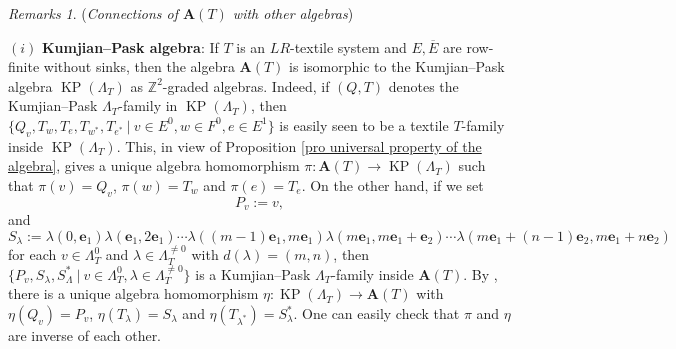 \documentclass[a4paper,reqno,12pt]{amsart}
\newcommand{\KP}{\operatorname{KP}}
\newcommand{\ea}{\mathbf{e}_1}
\newcommand{\eb}{\mathbf{e}_2}
\theoremstyle{definition}
\theoremstyle{remark}
\newtheorem{rmks}[thm]{Remarks}
\begin{document}
\begin{rmks}\label{rem connecting with other algebras}
(\emph{Connections of $\mathbf{A}(T)$ with other algebras})



$(i)$ \textbf{Kumjian--Pask algebra}: If $T$ is an $LR$-textile system and $E,\overline{E}$ are row-finite without sinks, then the algebra $\mathbf{A}(T)$ is isomorphic to the Kumjian--Pask algebra $\KP(\Lambda_T)$ as $\mathbb{Z}^2$-graded algebras. Indeed, if $(Q,T)$ denotes the Kumjian--Pask $\Lambda_T$-family in $\KP(\Lambda_T)$, then $\{Q_v,T_w,T_e,T_{w^*},T_{e^*}~|~v\in E^0,w\in F^0,e\in E^1\}$ is easily seen to be a textile $T$-family inside $\KP(\Lambda_T)$. This, in view of Proposition \ref{pro universal property of the algebra}, gives a unique algebra homomorphism $\pi:\mathbf{A}(T)\longrightarrow \KP(\Lambda_T)$ such that $\pi(v)=Q_v$, $\pi(w)=T_w$ and $\pi(e)=T_e$. On the other hand, if we set \[P_v:=v,\] and \[S_\lambda:=\lambda(0,\ea)\lambda(\ea,2\ea)\cdots \lambda((m-1)\ea,m\ea)\lambda(m\ea,m\ea+\eb)\cdots\lambda(m\ea+(n-1)\eb,m\ea+n\eb)\] for each $v\in \Lambda_T^0$ and $\lambda\in \Lambda_T^{\neq 0}$ with $d(\lambda)=(m,n)$, then $\{P_v,S_\lambda,S_{\Lambda}^*~|~v\in \Lambda_T^0,\lambda\in \Lambda_T^{\neq 0}\}$ is a Kumjian--Pask $\Lambda_T$-family inside $\mathbf{A}(T)$. By \cite[Theorem 3.4]{Pino}, there is a unique algebra homomorphism $\eta:\KP(\Lambda_T)\longrightarrow \mathbf{A}(T)$ with $\eta(Q_v)=P_v$, $\eta(T_\lambda)=S_\lambda$ and $\eta(T_{\lambda^*})=S_\lambda^*$. One can easily check that $\pi$ and $\eta$ are inverse of each other.  


\end{rmks}
\end{document}
